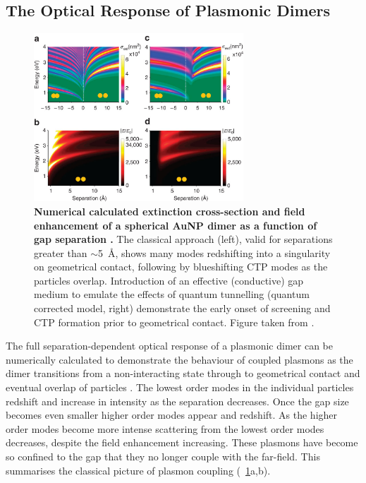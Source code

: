 \documentclass{article}
\begin{document}

\subsection{The Optical Response of Plasmonic Dimers}

\begin{figure}[bt]
\centering
\includegraphics[width=0.7\textwidth]{figures/literature/ncomms1806-f4}
\caption[Numerical calculated extinction cross-section and field enhancement of a spherical AuNP dimer as a function of gap separation \cite{esteban2012}]{\textbf{Numerical calculated extinction cross-section and field enhancement of a spherical AuNP dimer as a function of gap separation \cite{esteban2012}.} The classical approach (left), valid for separations greater than $\sim$\SI{5}{\angstrom}, shows many modes redshifting into a singularity on geometrical contact, following by blueshifting CTP modes as the particles overlap. Introduction of an effective (conductive) gap medium to emulate the effects of quantum tunnelling (quantum corrected model, right) demonstrate the early onset of screening and CTP formation prior to geometrical contact. Figure taken from \cite{esteban2012}.}
\label{fig:optical_response_dimer}
\end{figure}

The full separation-dependent optical response of a plasmonic dimer can be numerically calculated to demonstrate the behaviour of coupled plasmons as the dimer transitions from a non-interacting state through to geometrical contact and eventual overlap of particles \cite{romero2006, esteban2012}.
The lowest order modes in the individual particles redshift and increase in intensity as the separation decreases. Once the gap size becomes even smaller higher order modes appear and redshift. As the higher order modes become more intense scattering from the lowest order modes decreases, despite the field enhancement increasing. These plasmons have become so confined to the gap that they no longer couple with the far-field. This summarises the classical picture of plasmon coupling (\figurename~\ref{fig:optical_response_dimer}a,b).
\end{document}

